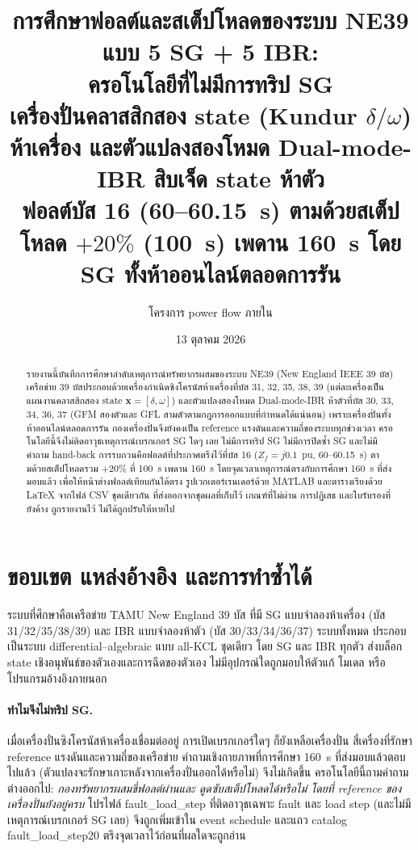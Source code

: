 \documentclass[12pt,a4paper]{article}
\title{\textbf{การศึกษาฟอลต์และสเต็ปโหลดของระบบ NE39 แบบ 5 SG + 5 IBR:\\ ครอโนโลยีที่ไม่มีการทริป SG}\\[2pt]
\large เครื่องปั่นคลาสสิกสอง state (Kundur $\delta/\omega$) ห้าเครื่อง และตัวแปลงสองโหมด Dual-mode-IBR สิบเจ็ด state ห้าตัว\\[1mm]
\normalsize ฟอลต์บัส 16 (60--60.15~s) ตามด้วยสเต็ปโหลด $+20\%$ (100~s) เพดาน 160~s โดย SG ทั้งห้าออนไลน์ตลอดการรัน}
\author{โครงการ power flow ภายใน}
\date{13 ตุลาคม 2026}
\newcommand{\code}[1]{{\ttfamily\small\hyphenchar\font=-1 #1}}
\newcommand{\vect}[1]{\boldsymbol{#1}}
\begin{document}
\maketitle

\begin{abstract}
รายงานนี้บันทึกการศึกษาลำดับเหตุการณ์ทรัพยากรผสมของระบบ NE39 (New England IEEE 39 บัส)
เครือข่าย 39 บัสประกอบด้วยเครื่องกำเนิดซิงโครนัสห้าเครื่องที่บัส 31, 32, 35, 38, 39
(แต่ละเครื่องเป็นแผนงานคลาสสิกสอง state $\vect x=[\delta,\omega]$)
และตัวแปลงสองโหมด Dual-mode-IBR ห้าตัวที่บัส 30, 33, 34, 36, 37
(GFM สองตัวและ GFL สามตัวตามกฎการออกแบบที่กำหนดได้แน่นอน)
เพราะเครื่องปั่นทั้งห้าออนไลน์ตลอดการรัน กองเครื่องปั่นจึงยังคงเป็น reference
แรงดันและความถี่ของระบบทุกช่วงเวลา ครอโนโลยีนี้จึงไม่ติดอาวุธเหตุการณ์เบรกเกอร์ SG ใดๆ เลย
ไม่มีการทริป SG ไม่มีการปิดซ้ำ SG และไม่มีคำถาม hand-back
การรบกวนคือฟอลต์ที่ประกาศตรึงไว้ที่บัส 16 ($Z_f=j0.1$~pu, 60--60.15~s)
ตามด้วยสเต็ปโหลดรวม $+20\%$ ที่ 100~s เพดาน 160~s
โดยจุดเวลาเหตุการณ์ตรงกับการศึกษา 160~s ที่ส่งมอบแล้ว เพื่อให้หน้าต่างฟอลต์เทียบกันได้ตรง
รูปเวกเตอร์เรนเดอร์ด้วย MATLAB และตารางเรียงด้วย \LaTeX{} จากไฟล์ CSV ชุดเดียวกัน
ที่ส่งออกจากชุดผลที่เก็บไว้ เกณฑ์ที่ไม่ผ่าน การปฏิเสธ และใบรับรองที่ยังค้าง
ถูกรายงานไว้ ไม่ได้ถูกปรับให้หายไป
\end{abstract}

\newpage
\tableofcontents
\newpage

\section{ขอบเขต แหล่งอ้างอิง และการทำซ้ำได้}\label{sec:scope}

ระบบที่ศึกษาคือเครือข่าย TAMU New England 39 บัส ที่มี SG แบบจำลองห้าเครื่อง
(บัส 31/32/35/38/39) และ IBR แบบจำลองห้าตัว (บัส 30/33/34/36/37) ระบบทั้งหมด
ประกอบเป็นระบบ differential--algebraic แบบ all-KCL ชุดเดียว โดย SG และ IBR ทุกตัว
ส่งบล็อก state เชิงอนุพันธ์ของตัวเองและการฉีดของตัวเอง ไม่มีอุปกรณ์ใดถูกมอบให้ตัวแก้
โมเดล หรือโปรแกรมอ้างอิงภายนอก

\paragraph{ทำไมจึงไม่ทริป SG.}
เมื่อเครื่องปั่นซิงโครนัสห้าเครื่องเชื่อมต่ออยู่ การเปิดเบรกเกอร์ใดๆ ก็ยังเหลือเครื่องปั่น
สี่เครื่องที่รักษา reference แรงดันและความถี่ของเครือข่าย คำถามเชิงกายภาพที่การศึกษา
160~s ที่ส่งมอบแล้วตอบไปแล้ว (ตัวแปลงจะรักษาเกาะหลังจากเครื่องปั่นออกได้หรือไม่)
จึงไม่เกิดขึ้น ครอโนโลยีนี้ถามคำถามต่างออกไป: \emph{กองทรัพยากรผสมขี่ฟอลต์ผ่านและ
ดูดซับสเต็ปโหลดได้หรือไม่ โดยที่ reference ของเครื่องปั่นยังอยู่ครบ}
โปรไฟล์ \code{fault\_load\_step} ที่ติดอาวุธเฉพาะ fault และ load step
(และไม่มีเหตุการณ์เบรกเกอร์ SG เลย) จึงถูกเพิ่มเข้าใน event schedule
และแถว catalog \code{fault\_load\_step20} ตรึงจุดเวลาไว้ก่อนที่ผลใดจะถูกอ่าน
\end{document}
